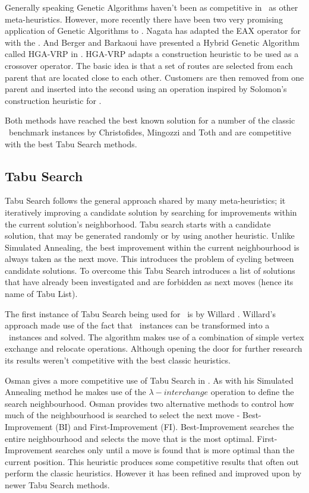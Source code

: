 Generally speaking Genetic Algorithms haven't been as competitive in \VRP\ as other meta-heuristics. However, more recently there have been two very promising application of Genetic Algorithms to \VRP. Nagata \cite{Nagata:2007} has adapted the EAX operator for with the \VRP. And Berger and Barkaoui have presented a Hybrid Genetic Algorithm called HGA-VRP in \cite{BM:2003}. HGA-VRP adapts a construction heuristic to be used as a crossover operator. The basic idea is that a set of routes are selected from each parent that are located close to each other. Customers are then removed from one parent and inserted into the second using an operation inspired by Solomon's construction heuristic for \VRPTW \cite{Solomon:1987}.

Both methods have reached the best known solution for a number of the classic \VRP\ benchmark instances by Christofides, Mingozzi and Toth \cite{CMT:1981} and are competitive with the best Tabu Search methods.

\subsection{Tabu Search}
\label{tabusearch}

Tabu Search follows the general approach shared by many meta-heuristics; it iteratively improving a candidate solution by searching for improvements within the current solution's neighborhood. Tabu search starts with a candidate solution, that may be generated randomly or by using another heuristic. Unlike Simulated Annealing, the best improvement within the current neighbourhood is always taken as the next move. This introduces the problem of cycling between candidate solutions. To overcome this Tabu Search introduces a list of solutions that have already been investigated and are forbidden as next moves (hence its name of Tabu List). 

The first instance of Tabu Search being used for \VRP\ is by Willard \cite{Willard:1989}. Willard's approach made use of the fact that \VRP\ instances can be transformed into a \MTSP\ instances and solved. The algorithm makes use of a combination of simple vertex exchange and relocate operations. Although opening the door for further research its results weren't competitive with the best classic heuristics. 

Osman gives a more competitive use of Tabu Search in \cite{Osman:1993}. As with his Simulated Annealing method he makes use of the $\lambda-interchange$ operation to define the search neighbourhood. Osman provides two alternative methods to control how much of the neighbourhood is searched to select the next move - Best-Improvement (BI) and First-Improvement (FI). Best-Improvement searches the entire neighbourhood and selects the move that is the most optimal. First-Improvement searches only until a move is found that is more optimal than the current position. This heuristic produces some competitive results that often out perform the classic heuristics. However it has been refined and improved upon by newer Tabu Search methods.

